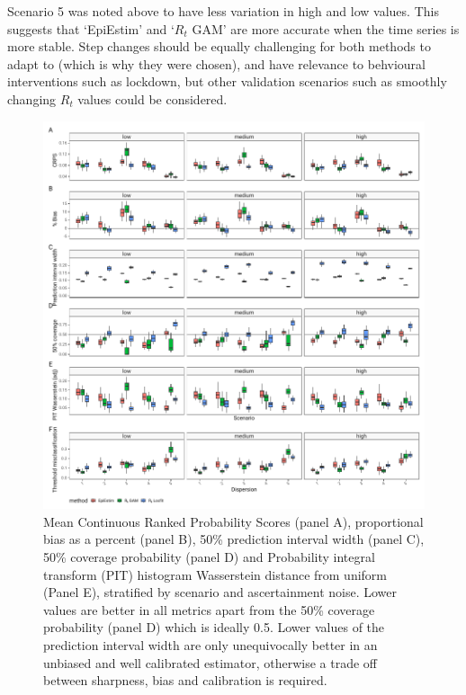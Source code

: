 \documentclass[a4paper, 12pt, twoside]{article}
\begin{document}
Scenario 5 was noted above to have less variation in high and low values. This suggests that `EpiEstim' and `$R_t$ GAM' are more accurate when the time series is more stable. Step changes should be equally challenging for both methods to adapt to (which is why they were chosen), and have relevance to behvioural interventions such as lockdown, but other validation scenarios such as smoothly changing $R_t$ values could be considered.

\begin{figure}[h!]
\centering
  \includegraphics{fig/fig4-metrics-by-scenario}
  \caption{Mean Continuous Ranked Probability Scores (panel A), proportional bias as a percent (panel B), 50\% prediction interval width (panel C), 50\% coverage probability (panel D) and Probability integral transform (PIT) histogram Wasserstein distance from uniform (Panel E), stratified by scenario and ascertainment noise. Lower values are better in all metrics apart from the 50\% coverage probability (panel D) which is ideally 0.5. Lower values of the prediction interval width are only unequivocally better in an unbiased and well calibrated estimator, otherwise a trade off between sharpness, bias and calibration is required.}
\label{fig:S4}
\end{figure}

\clearpage
\end{document}
